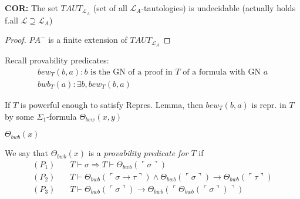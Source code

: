 \documentclass[12pt]{article}
\newcommand{\proves}{\vdash}
\newcommand{\gn}[1]{\ulcorner #1 \urcorner}
\begin{document}
\textbf{COR:} The set $TAUT_{\mathcal{L}_A}$
(set of all $\mathcal{L}_A$-tautologies) is undecidable
(actually holds f.all $\mathcal{L} \supseteq \mathcal{L}_A$)
\begin{proof}
  $PA^-$ is a finite extension of $TAUT_{\mathcal{L}_A}$
\end{proof}


Recall provability predicates:
\begin{align*}
  bew_T(b,a): b \text{ is the GN of a proof in $T$ of a formula with GN } a \\
  bwb_T(a): \exists b, bew_T(b,a)
\end{align*}

If $T$ is powerful enough to satisfy Repres. Lemma,
then $bew_T(b,a)$ is repr. in $T$ by some
$\Sigma_1$-formula $\Theta_{bew}(x,y)$

$\Theta_{bwb}(x)$


We say that $\Theta_{bwb}(x)$ is a \emph{provability predicate for $T$}
if
\begin{align*}
  (P_1)& \quad 
  T \proves \sigma \Rightarrow T \proves \Theta_{bwb}(\gn{\sigma}) \\
  (P_2)& \quad
  T \proves \Theta_{bwb}(\gn{\sigma \rightarrow \tau}) \wedge
        \Theta_{bwb}(\gn{\sigma}) \rightarrow \Theta_{bwb}(\gn{\tau}) \\
  (P_3)& \quad
  T \proves \Theta_{bwb}(\gn{\sigma}) \rightarrow 
        \Theta_{bwb}(\gn{\Theta_{bwb}(\gn{\sigma})})
\end{align*}
\end{document}
